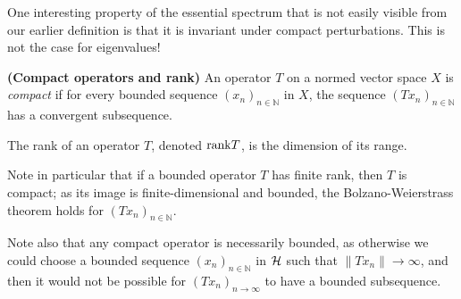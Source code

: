 \documentclass[../main.tex]{subfiles}
\begin{document}
One interesting property of the essential spectrum that is not easily visible from our earlier definition is that it is invariant under compact
perturbations. This is not the case for eigenvalues!

\begin{definition}{\textbf{(Compact operators and rank)}}
An operator $T$ on a normed vector space $X$ is \emph{compact} if for every bounded sequence $(x_n)_{n \in \mathbb{N}}$ in $X$, the sequence $(Tx_n)_{n \in \mathbb{N}}$ has a convergent subsequence.

The rank of an operator $T$, denoted $\mathrm{rank} T$, is the dimension of its range.
\end{definition}

Note in particular that if a bounded operator $T$ has finite rank, then $T$ is compact; as its image is finite-dimensional and bounded, 
the Bolzano-Weierstrass theorem holds for $(Tx_n)_{n \in \mathbb{N}}$.

Note also that any compact operator is necessarily bounded, as otherwise we could choose a bounded sequence $(x_n)_{n \in \mathbb{N}}$ in $\mathcal{H}$ such that $\|Tx_n\| \rightarrow \infty$, 
and then it would not be possible for $(Tx_n)_{n \rightarrow \infty}$ to have a bounded subsequence. 
\end{document}
